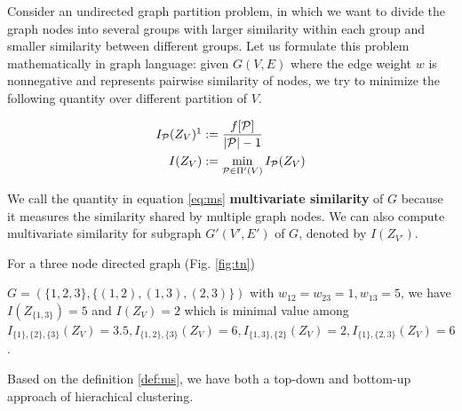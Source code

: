 \documentclass{article}
\begin{document}
Consider an undirected graph partition problem, in which we want to divide the graph nodes into several groups with larger similarity within each group and smaller similarity between different groups. Let us formulate this problem mathematically in graph language: given $G(V, E)$ where the edge weight $w$ is nonnegative and represents pairwise similarity of nodes, we try to minimize the following quantity over different partition of $V$.
\begin{definition}\label{def:ms}
\begin{align}
I_{\P}(Z_V) \footnotemark & := \frac{ f[\P] }{  \abs{\mathcal{P}} - 1 }\\
I(Z_V) & := \min_{\mathcal{P} \in \Pi'(V)} I_{\mathcal{P}}(Z_V)  \label{eq:ms}
\end{align}
\end{definition}
We call the quantity in equation \eqref{eq:ms} \textbf{multivariate similarity} of $G$ because it measures the similarity shared by multiple graph nodes. We can also compute multivariate similarity for subgraph $G'(V',E')$ of $G$, denoted by $I(Z_{V'})$. 
\begin{example}\label{eg:three}
For a three node directed graph (Fig. \ref{fig:tn}) 

$G=(\{1,2,3\},\{(1,2),(1,3),(2,3)\})$ with $w_{12}=w_{23}=1, w_{13}=5$, we have $I(Z_{\{1,3\}}) = 5$ and $I(Z_V) = 2$ which is minimal value among $I_{\{1\},\{2\},\{3\}}(Z_V)=3.5, I_{\{1, 2\},\{3\}}(Z_V)=6, I_{\{1,3\},\{2\}}(Z_V)=2, I_{\{1\},\{2,3\}}(Z_V)=6$.
\end{example}

Based on the definition \eqref{def:ms}, we have both a top-down and bottom-up approach of hierachical clustering.
\end{document}
